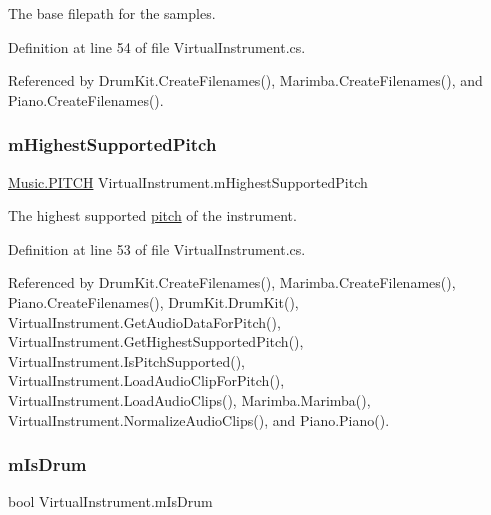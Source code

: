 The base filepath for the samples. 



Definition at line 54 of file Virtual\+Instrument.\+cs.



Referenced by Drum\+Kit.\+Create\+Filenames(), Marimba.\+Create\+Filenames(), and Piano.\+Create\+Filenames().

\mbox{\label{group___v_i_base_pro_var_ga61fb2c33b53a0f663047779d7ceb18f3}} 
\subsubsection{\texorpdfstring{m\+Highest\+Supported\+Pitch}{mHighestSupportedPitch}}
{\footnotesize\ttfamily \hyperlink{group___music_enums_ga508f69b199ea518f935486c990edac1d}{Music.\+P\+I\+T\+CH} Virtual\+Instrument.\+m\+Highest\+Supported\+Pitch\hspace{0.3cm}{\ttfamily [protected]}}



The highest supported \hyperlink{group___music_enums_ga508f69b199ea518f935486c990edac1d}{pitch} of the instrument. 



Definition at line 53 of file Virtual\+Instrument.\+cs.



Referenced by Drum\+Kit.\+Create\+Filenames(), Marimba.\+Create\+Filenames(), Piano.\+Create\+Filenames(), Drum\+Kit.\+Drum\+Kit(), Virtual\+Instrument.\+Get\+Audio\+Data\+For\+Pitch(), Virtual\+Instrument.\+Get\+Highest\+Supported\+Pitch(), Virtual\+Instrument.\+Is\+Pitch\+Supported(), Virtual\+Instrument.\+Load\+Audio\+Clip\+For\+Pitch(), Virtual\+Instrument.\+Load\+Audio\+Clips(), Marimba.\+Marimba(), Virtual\+Instrument.\+Normalize\+Audio\+Clips(), and Piano.\+Piano().

\mbox{\label{group___v_i_base_pro_var_ga47dbd8aa02ab32b8f802adfd2d3d81de}} 
\subsubsection{\texorpdfstring{m\+Is\+Drum}{mIsDrum}}
{\footnotesize\ttfamily bool Virtual\+Instrument.\+m\+Is\+Drum\hspace{0.3cm}{\ttfamily [protected]}}



